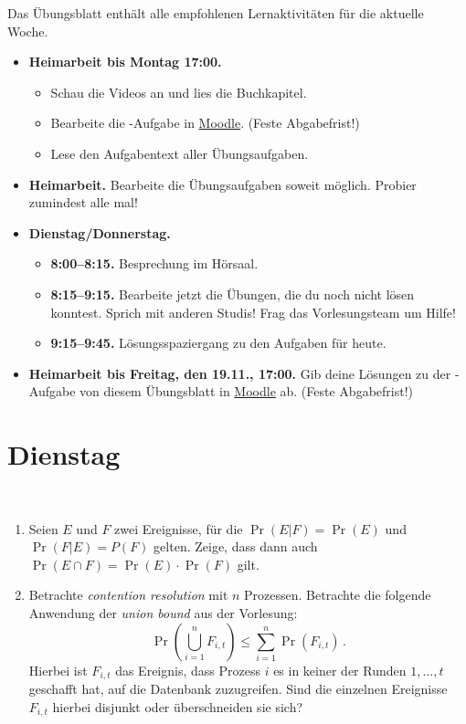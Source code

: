 \documentclass{uebung_cs}
\begin{document}
Das Übungsblatt enthält alle empfohlenen Lernaktivitäten für die aktuelle Woche.

\begin{itemize}
\item \textbf{Heimarbeit bis Montag 17:00.}
    \begin{itemize}
    \item 
    Schau die Videos an und lies die Buchkapitel.
    \item Bearbeite die -Aufgabe in \href{https://moodle.studiumdigitale.uni-frankfurt.de/moodle/course/view.php?id=2241}{Moodle}. (Feste Abgabefrist!)
    \item Lese den Aufgabentext aller Übungsaufgaben.
    \end{itemize}
\item \textbf{Heimarbeit.} Bearbeite die Übungsaufgaben soweit möglich. Probier zumindest alle mal!
\item \textbf{Dienstag/Donnerstag.}
\begin{itemize}
    \item \textbf{8:00--8:15.} Besprechung im Hörsaal.
    \item \textbf{8:15--9:15.} Bearbeite jetzt die Übungen, die du noch nicht lösen konntest. Sprich mit anderen Studis! Frag das Vorlesungsteam um Hilfe!
    \item \textbf{9:15--9:45.} Lösungsspaziergang zu den Aufgaben für heute.
\end{itemize}

\item \textbf{Heimarbeit bis Freitag, den 19.11., 17:00.} Gib deine Lösungen zu der -Aufgabe von diesem Übungsblatt in \href{https://moodle.studiumdigitale.uni-frankfurt.de/moodle/course/view.php?id=2241}{Moodle} ab. (Feste Abgabefrist!)
\end{itemize}

\section*{Dienstag}

\begin{aufgabe}[Wahrscheinlichkeitsrechnung]\
	\begin{enumerate}
		\item 
		Seien $E$ und $F$ zwei Ereignisse, für die $\Pr(E | F) = \Pr(E)$ und $\Pr(F | E) = P(F)$ gelten. Zeige, dass dann auch $\Pr(E \cap F) = \Pr(E) \cdot \Pr(F)$ gilt.
		\item Betrachte \textit{contention resolution} mit $n$ Prozessen. Betrachte die folgende Anwendung der \textit{union bound} aus der Vorlesung:
		\[
			\Pr\left(\bigcup_{i=1}^n F_{i,t}\right)
			\le
			\sum_{i=1}^n \Pr(F_{i,t})\,.
		\]
		Hierbei ist $F_{i,t}$ das Ereignis, dass Prozess $i$ es in keiner der Runden $1,\dots,t$ geschafft hat, auf die Datenbank zuzugreifen.
		Sind die einzelnen Ereignisse~$F_{i,t}$ hierbei disjunkt oder überschneiden sie sich?
	\end{enumerate}
\end{aufgabe}
\end{document}
